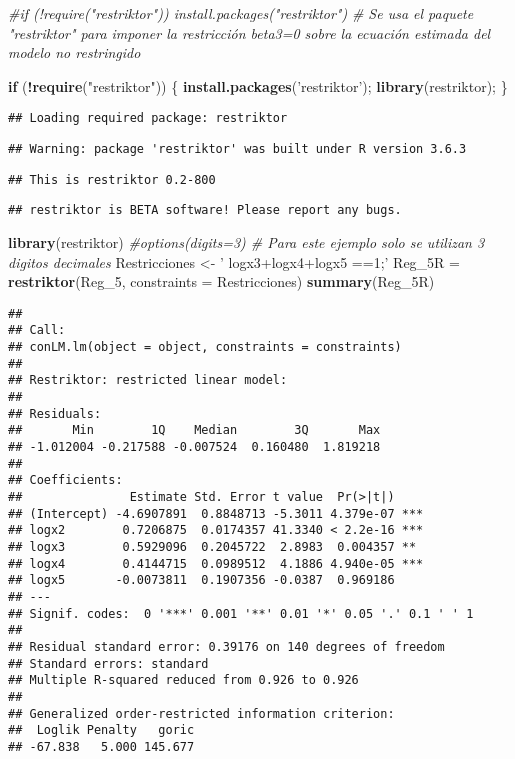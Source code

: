 \documentclass[
]{article}
\newenvironment{Shaded}{\begin{snugshade}}{\end{snugshade}}
\newcommand{\CommentTok}[1]{\textcolor[rgb]{0.56,0.35,0.01}{\textit{#1}}}
\newcommand{\ControlFlowTok}[1]{\textcolor[rgb]{0.13,0.29,0.53}{\textbf{#1}}}
\newcommand{\DataTypeTok}[1]{\textcolor[rgb]{0.13,0.29,0.53}{#1}}
\newcommand{\DecValTok}[1]{\textcolor[rgb]{0.00,0.00,0.81}{#1}}
\newcommand{\KeywordTok}[1]{\textcolor[rgb]{0.13,0.29,0.53}{\textbf{#1}}}
\newcommand{\NormalTok}[1]{#1}
\newcommand{\OperatorTok}[1]{\textcolor[rgb]{0.81,0.36,0.00}{\textbf{#1}}}
\newcommand{\StringTok}[1]{\textcolor[rgb]{0.31,0.60,0.02}{#1}}
\begin{document}
\begin{Shaded}
\begin{Highlighting}[]
\CommentTok{#if (!require("restriktor")) install.packages("restriktor")}
\CommentTok{# Se usa el paquete "restriktor" para imponer la restricción beta3=0 sobre la ecuación estimada del modelo no restringido}


\ControlFlowTok{if}\NormalTok{ (}\OperatorTok{!}\KeywordTok{require}\NormalTok{(}\StringTok{"restriktor"}\NormalTok{)) }
\NormalTok{\{}
  \KeywordTok{install.packages}\NormalTok{(}\StringTok{'restriktor'}\NormalTok{);}
  \KeywordTok{library}\NormalTok{(restriktor);}
\NormalTok{\}}
\end{Highlighting}
\end{Shaded}

\begin{verbatim}
## Loading required package: restriktor
\end{verbatim}

\begin{verbatim}
## Warning: package 'restriktor' was built under R version 3.6.3
\end{verbatim}

\begin{verbatim}
## This is restriktor 0.2-800
\end{verbatim}

\begin{verbatim}
## restriktor is BETA software! Please report any bugs.
\end{verbatim}

\begin{Shaded}
\begin{Highlighting}[]
\KeywordTok{library}\NormalTok{(restriktor)}
\CommentTok{#options(digits=3) # Para este ejemplo solo se utilizan 3 digitos decimales}
\NormalTok{Restricciones <-}\StringTok{ '}
\StringTok{logx3+logx4+logx5 ==1;'}
\NormalTok{Reg_5R =}\StringTok{ }\KeywordTok{restriktor}\NormalTok{(Reg_}\DecValTok{5}\NormalTok{, }\DataTypeTok{constraints =}\NormalTok{ Restricciones)}
\KeywordTok{summary}\NormalTok{(Reg_5R)}
\end{Highlighting}
\end{Shaded}

\begin{verbatim}
## 
## Call:
## conLM.lm(object = object, constraints = constraints)
## 
## Restriktor: restricted linear model:
## 
## Residuals:
##       Min        1Q    Median        3Q       Max 
## -1.012004 -0.217588 -0.007524  0.160480  1.819218 
## 
## Coefficients:
##               Estimate Std. Error t value  Pr(>|t|)    
## (Intercept) -4.6907891  0.8848713 -5.3011 4.379e-07 ***
## logx2        0.7206875  0.0174357 41.3340 < 2.2e-16 ***
## logx3        0.5929096  0.2045722  2.8983  0.004357 ** 
## logx4        0.4144715  0.0989512  4.1886 4.940e-05 ***
## logx5       -0.0073811  0.1907356 -0.0387  0.969186    
## ---
## Signif. codes:  0 '***' 0.001 '**' 0.01 '*' 0.05 '.' 0.1 ' ' 1
## 
## Residual standard error: 0.39176 on 140 degrees of freedom
## Standard errors: standard 
## Multiple R-squared reduced from 0.926 to 0.926 
## 
## Generalized order-restricted information criterion: 
##  Loglik Penalty   goric 
## -67.838   5.000 145.677
\end{verbatim}
\end{document}
